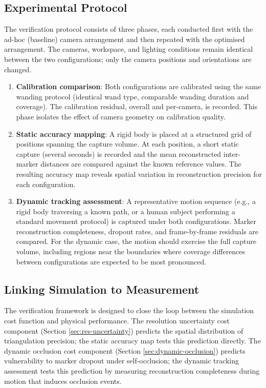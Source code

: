 \subsection{Experimental Protocol}

The verification protocol consists of three phases, each conducted first with the ad-hoc (baseline) camera arrangement and then repeated with the optimised arrangement. The cameras, workspace, and lighting conditions remain identical between the two configurations; only the camera positions and orientations are changed.

\begin{enumerate}
    \item \textbf{Calibration comparison}: Both configurations are calibrated using the same wanding protocol (identical wand type, comparable wanding duration and coverage). The calibration residual, overall and per-camera, is recorded. This phase isolates the effect of camera geometry on calibration quality.
    
    \item \textbf{Static accuracy mapping}: A rigid body is placed at a structured grid of positions spanning the capture volume. At each position, a short static capture (several seconds) is recorded and the mean reconstructed inter-marker distances are compared against the known reference values. The resulting accuracy map reveals spatial variation in reconstruction precision for each configuration.
    
    \item \textbf{Dynamic tracking assessment}: A representative motion sequence (e.g., a rigid body traversing a known path, or a human subject performing a standard movement protocol) is captured under both configurations. Marker reconstruction completeness, dropout rates, and frame-by-frame residuals are compared. For the dynamic case, the motion should exercise the full capture volume, including regions near the boundaries where coverage differences between configurations are expected to be most pronounced.
\end{enumerate}

\subsection{Linking Simulation to Measurement}

The verification framework is designed to close the loop between the simulation cost function and physical performance. The resolution uncertainty cost component (Section \ref{sec:res-uncertainty}) predicts the spatial distribution of triangulation precision; the static accuracy map tests this prediction directly. The dynamic occlusion cost component (Section \ref{sec:dynamic-occlusion}) predicts vulnerability to marker dropout under self-occlusion; the dynamic tracking assessment tests this prediction by measuring reconstruction completeness during motion that induces occlusion events.

